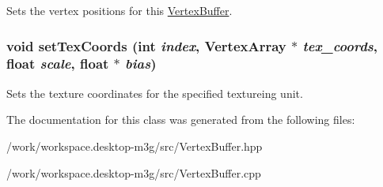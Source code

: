 Sets the vertex positions for this \hyperlink{classm3g_1_1VertexBuffer}{VertexBuffer}. \hypertarget{classm3g_1_1VertexBuffer_9fd3dd3f78138d654d18863e4f1329f4}{
\subsubsection[{setTexCoords}]{\setlength{\rightskip}{0pt plus 5cm}void setTexCoords (int {\em index}, \/  {\bf VertexArray} $\ast$ {\em tex\_\-coords}, \/  float {\em scale}, \/  float $\ast$ {\em bias})}}
\label{classm3g_1_1VertexBuffer_9fd3dd3f78138d654d18863e4f1329f4}


Sets the texture coordinates for the specified textureing unit. 

The documentation for this class was generated from the following files:\begin{CompactItemize}
\item 
/work/workspace.desktop-m3g/src/VertexBuffer.hpp\item 
/work/workspace.desktop-m3g/src/VertexBuffer.cpp\end{CompactItemize}
